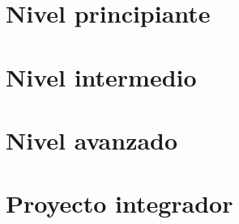 \documentclass[11pt,oneside,openany]{book}
\begin{document}
\frontmatter

\tableofcontents


\mainmatter

\part{Nivel principiante}




\part{Nivel intermedio}




\part{Nivel avanzado}



\part{Proyecto integrador}


\appendix


\end{document}
